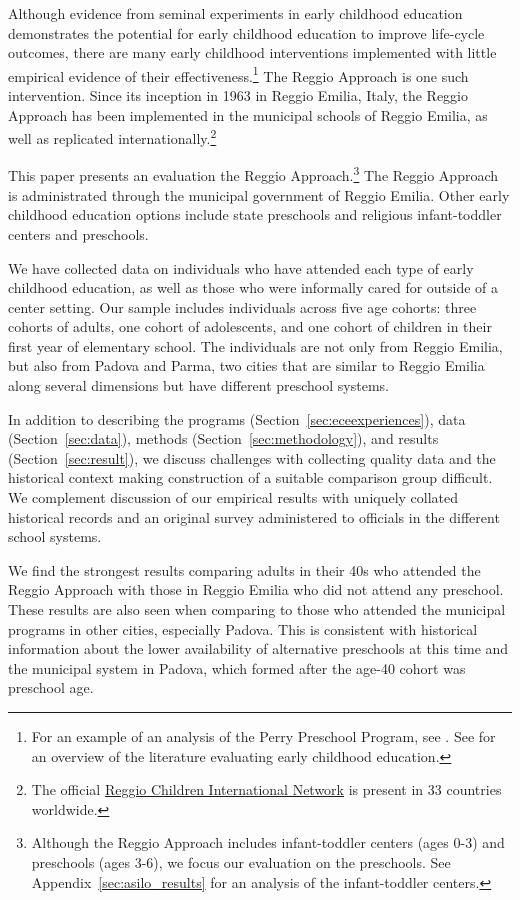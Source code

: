 Although evidence from seminal experiments in early childhood education demonstrates the potential for early childhood education to improve life-cycle outcomes, there are many early childhood interventions implemented with little empirical evidence of their effectiveness.\footnote{For an example of an analysis of the Perry Preschool Program, see \citet{Heckman_Moon_etal_2010_QE}. See \citet{Elango_Hojman_etal_2016_Early-Edu} for an overview of the literature evaluating early childhood education.} The Reggio Approach is one such intervention. Since its inception in 1963 in Reggio Emilia, Italy, the Reggio Approach has been implemented in the municipal schools of Reggio Emilia, as well as replicated internationally.\footnote{The official \href{http://www.reggiochildren.it/network/?lang=en}{Reggio Children International Network} is present in 33 countries worldwide.}

This paper presents an evaluation the Reggio Approach.\footnote{Although the Reggio Approach includes infant-toddler centers (ages 0-3) and preschools (ages 3-6), we focus our evaluation on the preschools. See Appendix~\ref{sec:asilo_results} for an analysis of the infant-toddler centers.} The Reggio Approach is administrated through the municipal government of Reggio Emilia. Other early childhood education options include state preschools and religious infant-toddler centers and preschools. 

We have collected data on individuals who have attended each type of early childhood education, as well as those who were informally cared for outside of a center setting. Our sample includes individuals across five age cohorts: three cohorts of adults, one cohort of adolescents, and one cohort of children in their first year of elementary school. The individuals are not only from Reggio Emilia, but also from Padova and Parma, two cities that are similar to Reggio Emilia along several dimensions but have different preschool systems. 

In addition to describing the programs (Section~\ref{sec:eceexperiences}), data (Section~\ref{sec:data}), methods (Section~\ref{sec:methodology}), and results (Section~\ref{sec:result}), we discuss challenges with collecting quality data and the historical context making construction of a suitable comparison group difficult. We complement discussion of our empirical results with uniquely collated historical records and an original survey administered to officials in the different school systems.

We find the strongest results comparing adults in their 40s who attended the Reggio Approach with those in Reggio Emilia who did not attend any preschool. These results are also seen when comparing to those who attended the municipal programs in other cities, especially Padova. This is consistent with historical information about the lower availability of alternative preschools at this time and the municipal system in Padova, which formed after the age-40 cohort was preschool age.
